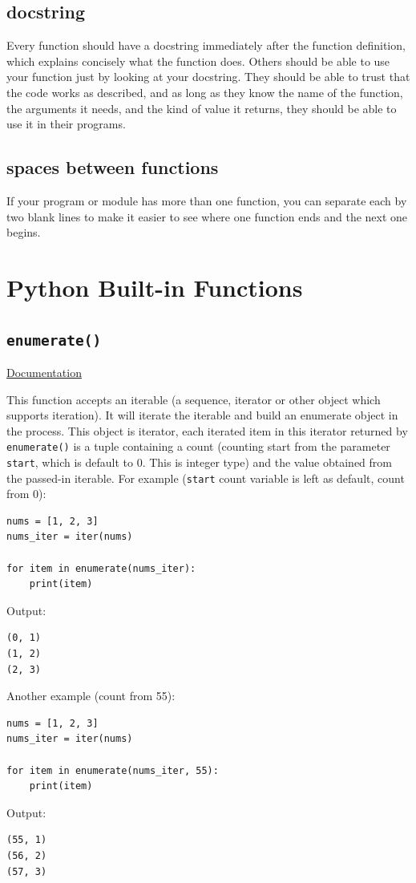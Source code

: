 \documentclass[12pt]{book}
\begin{document}
\subsection{docstring}
\label{sec:orga97e28b}
Every function should have a docstring immediately after the function definition, which explains concisely what the function does. Others should be able to use your function just by looking at your docstring. They should be able to trust that the code works as described, and as long as they know the name of the function, the arguments it needs, and the kind of value it returns, they should be able to use it in their programs.
\subsection{spaces between functions}
\label{sec:org5961556}
If your program or module has more than one function, you can separate each by two blank lines to make it easier to see where one function ends and the next one begins.
\section{Python Built-in Functions}
\label{sec:orgd1b30f3}
\subsection{\texttt{enumerate()}}
\label{sec:orgd19a50e}
\href{https://docs.python.org/3/library/functions.html\#enumerate}{Documentation}

This function accepts an iterable (a sequence, iterator or other object which supports iteration). It will iterate the iterable and build an enumerate object in the process. This object is iterator, each iterated item in this iterator returned by \texttt{enumerate()} is a tuple containing a count (counting start from the parameter \texttt{start}, which is default to 0. This is integer type) and the value obtained from the passed-in iterable. For example (\texttt{start} count variable is left as default, count from 0):
\begin{verbatim}
nums = [1, 2, 3]
nums_iter = iter(nums)

for item in enumerate(nums_iter):
    print(item)
\end{verbatim}
Output:
\begin{verbatim}
(0, 1)
(1, 2)
(2, 3)
\end{verbatim}
Another example (count from 55):
\begin{verbatim}
nums = [1, 2, 3]
nums_iter = iter(nums)

for item in enumerate(nums_iter, 55):
    print(item)
\end{verbatim}
Output:
\begin{verbatim}
(55, 1)
(56, 2)
(57, 3)
\end{verbatim}
\end{document}
